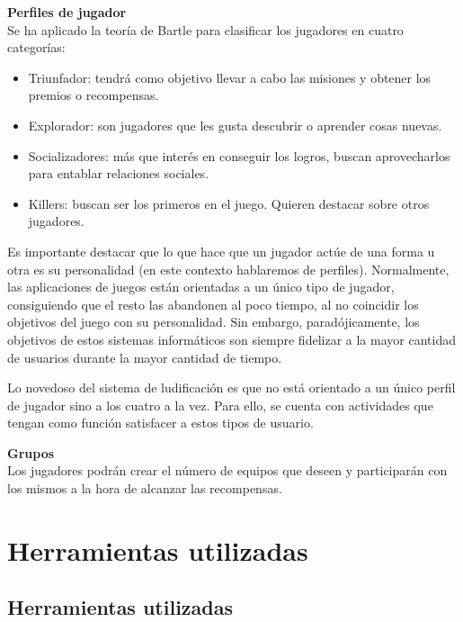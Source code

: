 \documentclass[twoside]{report}
\begin{document}
\textbf{Perfiles de jugador\cite{iebsctj}}\\ 

Se ha aplicado la teoría de Bartle para clasificar los jugadores en cuatro categorías:
\begin{itemize}

\item Triunfador: tendrá como objetivo llevar a cabo las misiones y obtener los premios o recompensas.
\item Explorador: son jugadores que les gusta descubrir o aprender cosas nuevas.
\item Socializadores: más que interés en conseguir los logros, buscan aprovecharlos para entablar relaciones sociales.
\item Killers: buscan ser los primeros en el juego. Quieren destacar sobre otros jugadores.

\end{itemize}

Es importante destacar que lo que hace que un jugador actúe de una forma u otra es su personalidad (en este contexto hablaremos de perfiles). Normalmente, las aplicaciones de juegos están orientadas a un único tipo de jugador, consiguiendo que el resto las abandonen al poco tiempo, al no coincidir los objetivos del juego con su personalidad. Sin embargo, paradójicamente, los objetivos de estos sistemas informáticos son siempre fidelizar a la mayor cantidad de usuarios durante la mayor cantidad de tiempo.

Lo novedoso del sistema de ludificación es que no está orientado a un único perfil de jugador sino a los cuatro a la vez. Para ello, se cuenta con actividades que tengan como función satisfacer a estos tipos de usuario. 


\textbf{Grupos}\\

Los jugadores podrán crear el número de equipos que deseen y participarán con los mismos a la hora de alcanzar las recompensas.

\chapter{Herramientas utilizadas}
\section{Herramientas utilizadas}
\end{document}
